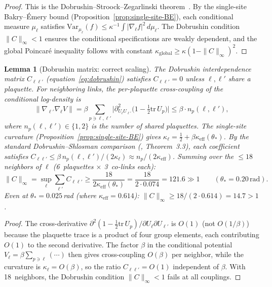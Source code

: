 \documentclass[11pt]{article}
\newtheorem{lemma}[theorem]{Lemma}
\theoremstyle{definition}
\newcommand{\tr}{\mathrm{tr}}
\begin{document}
\begin{proof}
This is the Dobrushin--Stroock--Zegarlinski
theorem~\cite{StroockZegarlinski}.
By the single-site Bakry--\'Emery bound
(Proposition~\ref{prop:single-site-BE}), each conditional measure
$\mu_\ell$ satisfies $\mathrm{Var}_{\mu_\ell}(f)\le\kappa^{-1}
\int|\nabla_\ell f|^2\,d\mu_\ell$.  The Dobrushin condition
$\|C\|_\infty<1$ ensures the conditional specifications are
weakly dependent, and the global Poincar\'e inequality follows
with constant $\kappa_{\mathrm{global}}\ge\kappa(1-\|C\|_\infty)^2$.
\end{proof}

\begin{lemma}[Dobrushin matrix: correct scaling]%
\label{lem:dobrushin-bound}
The Dobrushin interdependence matrix $C_{\ell\ell'}$
(equation~\eqref{eq:dobrushin}) satisfies
$C_{\ell\ell'}=0$ unless $\ell,\ell'$ share a plaquette.  For
neighboring links, the per-plaquette cross-coupling of the
conditional log-density is
\begin{equation}
\|\nabla_{\ell'}\nabla_\ell V\|
=\beta\sum_{p\ni\ell,\ell'}
\bigl|\partial^2_{U_\ell U_{\ell'}}
\bigl(1-\tfrac{1}{2}\tr\,U_p\bigr)\bigr|
\le\beta\cdot n_p(\ell,\ell'),
\end{equation}
where $n_p(\ell,\ell')\in\{1,2\}$ is the number of shared
plaquettes.  The single-site curvature
(Proposition~\ref{prop:single-site-BE}) gives
$\kappa_\ell=\frac{1}{2}+\beta\kappa_{\mathrm{eff}}(\theta_*)$.
By the standard Dobrushin--Shlosman comparison
(\cite{StroockZegarlinski}, Theorem~3.3), each coefficient
satisfies
$C_{\ell\ell'}\le\beta\,n_p(\ell,\ell')/
(2\kappa_\ell)
\approx n_p/(2\kappa_{\mathrm{eff}})$.
Summing over the $\le 18$ neighbors of $\ell$
(6~plaquettes $\times$ 3~co-links each):
\begin{equation}\label{eq:dobrushin-true}
\|C\|_\infty
=\sup_\ell\sum_{\ell'}C_{\ell\ell'}
\ge\frac{18}{2\kappa_{\mathrm{eff}}(\theta_*)}
=\frac{18}{2\cdot 0.074}=121.6\gg 1
\qquad(\theta_*=0.20\,\mathrm{rad}).
\end{equation}
Even at $\theta_*=0.025$\,rad (where $\kappa_{\mathrm{eff}}=0.614$):
$\|C\|_\infty\ge 18/(2\cdot 0.614)=14.7>1$.
\end{lemma}

\begin{proof}
The cross-derivative
$\partial^2(1-\frac{1}{2}\tr\,U_p)/
\partial U_\ell\partial U_{\ell'}$
is $O(1)$ (not $O(1/\beta)$) because the plaquette trace is a
product of four group elements, each contributing $O(1)$ to the
second derivative.  The factor $\beta$ in the conditional
potential $V_\ell=\beta\sum_{p\ni\ell}(\cdots)$ then gives
cross-coupling $O(\beta)$ per neighbor, while the curvature is
$\kappa_\ell=O(\beta)$, so the ratio $C_{\ell\ell'}=O(1)$
independent of $\beta$.  With 18~neighbors, the Dobrushin
condition $\|C\|_\infty<1$ fails at all couplings.
\end{proof}
\end{document}
